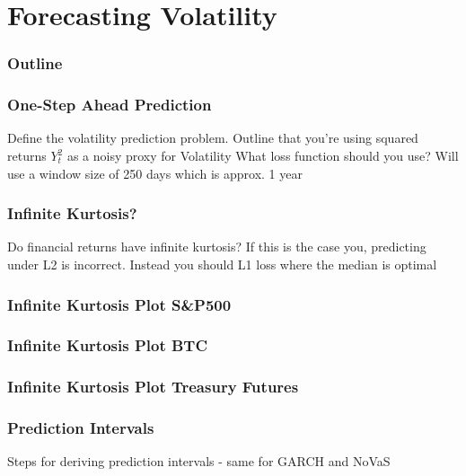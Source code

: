 \documentclass{beamer}
\begin{document}



\section{Forecasting Volatility}

\begin{frame}
\frametitle{Outline}
\tableofcontents[currentsection]
\end{frame}

\begin{frame}
\frametitle{One-Step Ahead Prediction}
Define the volatility prediction problem.
Outline that you're using squared returns $Y_{t}^2$ as a noisy proxy for Volatility
What loss function should you use?
Will use a window size of 250 days which is approx. 1 year
\end{frame}

\begin{frame}
\frametitle{Infinite Kurtosis?}
Do financial returns have infinite kurtosis?
If this is the case you, predicting under L2 is incorrect. Instead you should L1 loss where the median is optimal
\end{frame}

\begin{frame}
\frametitle{Infinite Kurtosis Plot S&P500}

\end{frame}

\begin{frame}
\frametitle{Infinite Kurtosis Plot BTC}

\end{frame}

\begin{frame}
\frametitle{Infinite Kurtosis Plot Treasury Futures}

\end{frame}

\begin{frame}
\frametitle{Prediction Intervals}
Steps for deriving prediction intervals - same for GARCH and NoVaS
\end{frame}
\end{document}
